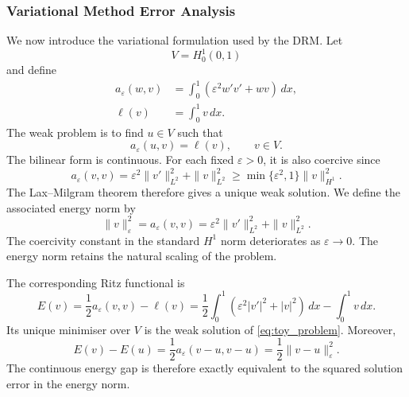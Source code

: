 \documentclass[11pt, onecolumn]{report}
\begin{document}
\subsubsection{Variational Method Error Analysis}

We now introduce the variational formulation used by the DRM. Let
\begin{equation*}
    V=H_0^1(0,1)
\end{equation*}
and define
\begin{align}
    a_\varepsilon(w,v)
    &=
    \int_0^1
    \left(
        \varepsilon^2w'v'+wv
    \right)\,dx,
    \\
    \ell(v)
    &=
    \int_0^1v\,dx.
\end{align}
The weak problem is to find \(u\in V\) such that
\begin{equation}
    a_\varepsilon(u,v)=\ell(v),
    \qquad
    v\in V.
    \label{eq:toy_weak_form}
\end{equation}
The bilinear form is continuous. For each fixed \(\varepsilon>0\), it is also coercive since
\begin{equation*}
    a_\varepsilon(v,v)
    =
    \varepsilon^2\|v'\|_{L^2}^2
    +
    \|v\|_{L^2}^2
    \geq
    \min\{\varepsilon^2,1\}
    \|v\|_{H^1}^2.
\end{equation*}
The Lax--Milgram theorem therefore gives a unique weak solution. We define the associated energy norm by
\begin{equation}
    \|v\|_\varepsilon^2
    =
    a_\varepsilon(v,v)
    =
    \varepsilon^2\|v'\|_{L^2}^2
    +
    \|v\|_{L^2}^2.
    \label{eq:energy_norm}
\end{equation}
The coercivity constant in the standard \(H^1\) norm deteriorates as \(\varepsilon\to0\). The energy norm retains the natural scaling of the problem.

The corresponding Ritz functional is
\begin{equation}
    E(v)
    =
    \frac12a_\varepsilon(v,v)-\ell(v)
    =
    \frac12
    \int_0^1
    \left(
        \varepsilon^2|v'|^2+|v|^2
    \right)\,dx
    -
    \int_0^1v\,dx.
    \label{eq:toy_ritz_energy}
\end{equation}
Its unique minimiser over \(V\) is the weak solution of
\eqref{eq:toy_problem}. Moreover,
\begin{equation}
    E(v)-E(u)
    =
    \frac12a_\varepsilon(v-u,v-u)
    =
    \frac12\|v-u\|_\varepsilon^2.
    \label{eq:ritz_energy_gap}
\end{equation}
The continuous energy gap is therefore exactly equivalent to the squared solution error in the energy norm.
\end{document}
